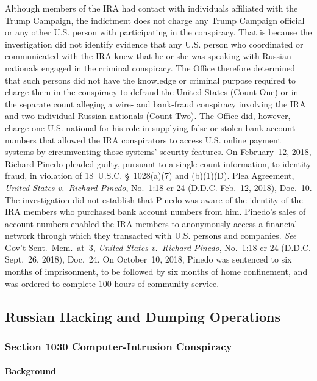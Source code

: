 Although members of the IRA had contact with individuals affiliated with the Trump Campaign, the indictment does not charge any Trump Campaign official or any other U.S. person with participating in the conspiracy.
That is because the investigation did not identify evidence that any U.S. person who coordinated or communicated with the IRA knew that he or she was speaking with Russian nationals engaged in the criminal conspiracy.
The Office therefore determined that such persons did not have the knowledge or criminal purpose required to charge them in the conspiracy to defraud the United States (Count One) or in the separate count alleging a wire- and bank-fraud conspiracy involving the IRA and two individual Russian nationals (Count Two).
The Office did, however, charge one U.S. national for his role in supplying false or stolen bank account numbers that allowed the IRA conspirators to access U.S. online payment systems by circumventing those systems' security features.
On February~12, 2018, Richard Pinedo pleaded guilty, pursuant to a single-count information, to identity fraud, in violation of 18~U.S.C. \S~1028(a)(7) and (b)(1)(D).
Plea Agreement, \textit{United States v.\ Richard Pinedo}, No.~1:18-cr-24 (D.D.C. Feb.~12, 2018), Doc.~10.
The investigation did not establish that Pinedo was aware of the identity of the IRA members who purchased bank account numbers from him.
Pinedo's sales of account numbers enabled the IRA members to anonymously access a financial network through which they transacted with U.S. persons and companies.
\textit{See} Gov't Sent.~Mem.~at~3, \textit{United States v.\ Richard Pinedo}, No.~1:18-cr-24 (D.D.C. Sept.~26, 2018), Doc.~24.
On October~10, 2018, Pinedo was sentenced to six months of imprisonment, to be followed by six months of home confinement, and was ordered to complete 100 hours of community service.

\subsection{Russian Hacking and Dumping Operations}

\subsubsection{Section 1030 Computer-Intrusion Conspiracy}

\paragraph{Background}

